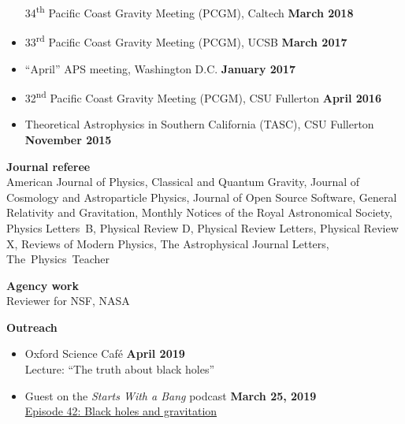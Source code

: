 \documentclass[margin,line]{res}
\begin{document}
\begin{resume}
\begin{itemize}
		      34\textsuperscript{th} Pacific Coast Gravity Meeting (PCGM),
		      Caltech
		      \hfill {\bf March 2018}
		\item[]
		      33\textsuperscript{rd} Pacific Coast Gravity Meeting (PCGM),
		      UCSB
		      \hfill {\bf March 2017}
		\item[]
		      ``April'' APS meeting, Washington D.C.
		      \hfill {\bf January 2017}
		\item[]
		      32\textsuperscript{nd} Pacific Coast Gravity Meeting (PCGM),
		      CSU Fullerton
		      \hfill {\bf April 2016}
		\item[]
		      Theoretical Astrophysics in Southern California (TASC),
		      CSU Fullerton
		      \hfill {\bf November 2015}
	\end{itemize}

	{\bf Journal referee}
	\vspace*{.05in}\\
	\hspace*{1em}
	American Journal of Physics,
	Classical and Quantum Gravity,
	Journal of Cosmology and Astroparticle Physics,
	Journal of Open Source Software,
	General Relativity and Gravitation,
	Monthly Notices of the Royal Astronomical Society,
	Physics Letters~B,
	Physical Review D,
	Physical Review Letters,
	Physical Review X,
	Reviews of Modern Physics,
	The Astrophysical Journal Letters,
	The~Physics~Teacher

	{\bf Agency work}
	\vspace*{.05in}\\
	\hspace*{1em}
	Reviewer for NSF, NASA

		{\bf Outreach}
	\vspace*{.05in}
	\begin{itemize}

		\item[] Oxford Science Café
		      \hfill {\bf April 2019} \\
		      \hspace*{1em} Lecture: ``The truth about black holes''

		\item[] Guest on the {\it Starts With a Bang} podcast
		      \hfill {\bf March 25, 2019} \\
		      \hspace*{1em}
		      \href{https://soundcloud.com/ethan-siegel-172073460/starts-with-a-bang-42-black-holes-and-gravitation}{Episode 42: Black holes and gravitation}



\end{itemize}
\end{resume}
\end{document}
